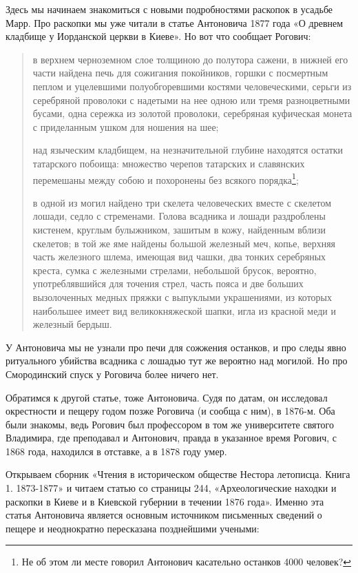 Здесь мы начинаем знакомиться с новыми подробностями раскопок в усадьбе Марр. Про раскопки мы уже читали в статье Антоновича 1877 года «О древнем кладбище у Иорданской церкви в Киеве». Но вот что сообщает Рогович: 

\begin{quotation}
в верхнем черноземном слое толщиною до полутора сажени, в нижней его части найдена печь для сожигания покойников, горшки с посмертным пеплом и уцелевшими полуобгоревшими костями человеческими, серьги из серебряной проволоки с надетыми на нее одною или тремя разноцветными бусами, одна сережка из золотой проволоки, серебряная куфическая монета с приделанным ушком для ношения на шее; 

над языческим кладбищем, на незначительной глубине находятся остатки татарского побоища: множество черепов татарских и славянских перемешаны между собою и похоронены без всякого порядка\footnote{Не об этом ли месте говорил Антонович касательно останков 4000 человек?}; 

в одной из могил найдено три скелета человеческих вместе с скелетом лошади, седло с стременами. Голова всадника и лошади раздроблены кистенем, круглым булыжником, зашитым в кожу, найденным вблизи скелетов; в той же яме найдены большой железный меч, копье, верхняя часть железного шлема, имеющая вид чашки, два тонких серебряных креста, сумка с железными стрелами, небольшой брусок, вероятно, употреблявшийся для точения стрел, часть пояса и две больших вызолоченных медных пряжки с выпуклыми украшениями, из которых наибольшее имеет вид великокняжеской шапки, игла из красной меди и железный бердыш.
\end{quotation}

У Антоновича мы не узнали про печи для сожжения останков, и про следы явно ритуального убийства всадника с лошадью тут же вероятно над могилой. Но про Смородинский спуск у Роговича более ничего нет.

Обратимся к другой статье, тоже Антоновича. Судя по датам, он исследовал окрестности и пещеру годом позже Роговича (и сообща с ним), в 1876-м. Оба были знакомы, ведь Рогович был профессором в том же университете святого Владимира, где преподавал и Антонович, правда в указанное время Рогович, с 1868 года, находился в отставке, а в 1878 году умер.

Открываем сборник «Чтения в историческом обществе Нестора летописца. Книга 1. 1873-1877»\cite{chtenianestora01} и читаем статью со страницы 244, «Археологические находки и раскопки в Киеве и в Киевской губернии в течении 1876 года». Именно эта статья Антоновича является основным источником письменных сведений о пещере и неоднократно пересказана позднейшими учеными:

